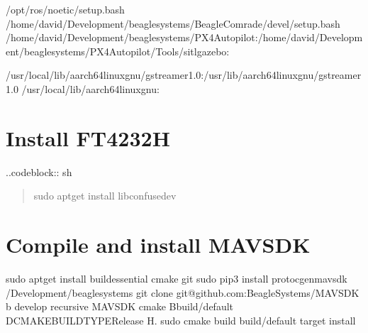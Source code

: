 \documentclass[letterpaper,10pt,english]{sphinxmanual}
\begin{document}
\begin{sphinxVerbatim}[commandchars=\\\{\}]

 /opt/ros/noetic/setup.bash
 /home/david/Development/beaglesystems/BeagleComrade/devel/setup.bash
 /home/david/Development/beaglesystems/PX4\PYGZhy{}Autopilot:/home/david/Development/beaglesystems/PX4\PYGZhy{}Autopilot/Tools/sitl\PYGZus{}gazebo:


 /usr/local/lib/aarch64\PYGZhy{}linux\PYGZhy{}gnu/gstreamer\PYGZhy{}1.0:/usr/lib/aarch64\PYGZhy{}linux\PYGZhy{}gnu/gstreamer\PYGZhy{}1.0
 /usr/local/lib/aarch64\PYGZhy{}linux\PYGZhy{}gnu:
\end{sphinxVerbatim}


\section{Install FT4232H}
\label{\detokenize{source/howtos/install_ftdi4232h:install-ft4232h}}\label{\detokenize{source/howtos/install_ftdi4232h::doc}}
..code\sphinxhyphen{}block:: sh
\begin{quote}

sudo apt\sphinxhyphen{}get install libconfuse\sphinxhyphen{}dev
\end{quote}


\section{Compile and install MAVSDK}
\label{\detokenize{source/howtos/install_mavsdk:compile-and-install-mavsdk}}\label{\detokenize{source/howtos/install_mavsdk::doc}}
\begin{sphinxVerbatim}[commandchars=\\\{\}]
sudo apt\PYGZhy{}get install build\PYGZhy{}essential cmake git
sudo pip3 install protoc\PYGZus{}gen\PYGZus{}mavsdk
 \PYGZti{}/Development/beaglesystems
git clone git@github.com:BeagleSystems/MAVSDK \PYGZhy{}b develop \PYGZhy{}\PYGZhy{}recursive
 MAVSDK
cmake \PYGZhy{}Bbuild/default \PYGZhy{}DCMAKE\PYGZus{}BUILD\PYGZus{}TYPERelease \PYGZhy{}H.
sudo cmake \PYGZhy{}\PYGZhy{}build build/default \PYGZhy{}\PYGZhy{}target install
\end{sphinxVerbatim}
\end{document}
